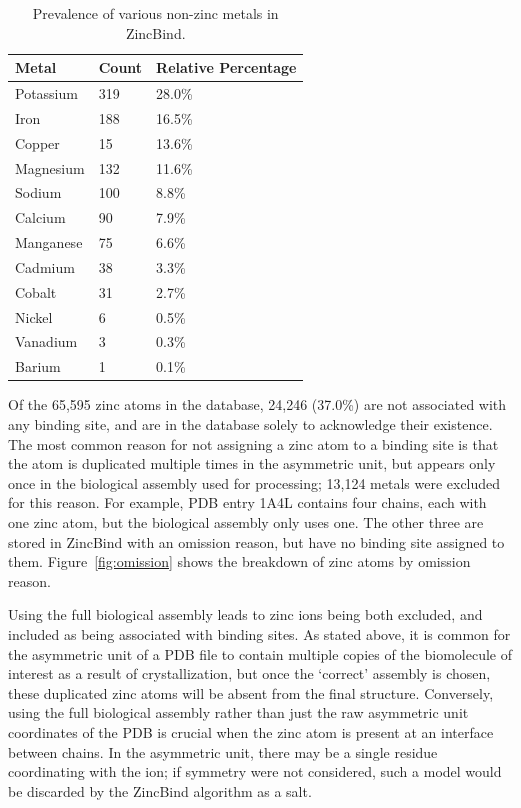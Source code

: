 \begin{table}
  \caption{\label{tab:metalcount}Prevalence of various non-zinc metals in ZincBind.}
\begin{center}
\begin{tabular}{lll} \hline
Metal & Count & Relative Percentage  \\ \hline
Potassium & 319   & 28.0\% \\
Iron      & 188   & 16.5\% \\
Copper    & 15    & 13.6\% \\
Magnesium & 132   & 11.6\% \\
Sodium    & 100   & 8.8\%  \\ 
Calcium   & 90    & 7.9\%  \\
Manganese & 75    & 6.6\%  \\
Cadmium   & 38    & 3.3\%  \\
Cobalt    & 31    & 2.7\%  \\
Nickel    & 6     & 0.5\%  \\
Vanadium  & 3     & 0.3\%  \\
Barium    & 1     & 0.1\%  \\ \hline
\end{tabular}
\end{center}
\end{table}

Of the 65,595 zinc atoms in the database, 24,246 (37.0\%) are not associated with any binding site, and are in the database solely to acknowledge their existence. The most common reason for not assigning a zinc atom to a binding site is that the atom is duplicated multiple times in the asymmetric unit, but appears only once in the biological assembly used for processing; 13,124 metals were excluded for this reason. For example, PDB entry 1A4L contains four chains, each with one zinc atom, but the biological assembly only uses one. The other three are stored in ZincBind with an omission reason, but have no binding site assigned to them. Figure~\ref{fig:omission} shows the breakdown of zinc atoms by omission reason.

Using the full biological assembly leads to zinc ions being both excluded, and included as being associated with binding sites. As stated above, it is common for the asymmetric unit of a PDB file to contain multiple copies of the biomolecule of interest as a result of crystallization, but once the `correct' assembly is chosen, these duplicated zinc atoms will be absent from the final structure. Conversely, using the full biological assembly rather than just the raw asymmetric unit coordinates of the PDB is crucial when the zinc atom is present at an interface between chains. In the asymmetric unit, there may be a single residue coordinating with the ion; if symmetry were not considered, such a model would be discarded by the ZincBind algorithm as a salt.

